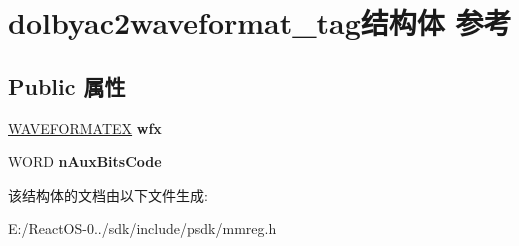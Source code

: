 \hypertarget{structdolbyac2waveformat__tag}{}\section{dolbyac2waveformat\+\_\+tag结构体 参考}
\label{structdolbyac2waveformat__tag}
\subsection*{Public 属性}
\begin{DoxyCompactItemize}
\item 
\mbox{\label{structdolbyac2waveformat__tag_a568819e0cd9f571ed2b7181648610e3f}} 
\hyperlink{struct_w_a_v_e_f_o_r_m_a_t_e_x}{W\+A\+V\+E\+F\+O\+R\+M\+A\+T\+EX} {\bfseries wfx}
\item 
\mbox{\label{structdolbyac2waveformat__tag_a73cc8769d8a77a374cefa543c048572c}} 
W\+O\+RD {\bfseries n\+Aux\+Bits\+Code}
\end{DoxyCompactItemize}


该结构体的文档由以下文件生成\+:\begin{DoxyCompactItemize}
\item 
E\+:/\+React\+O\+S-\/0../sdk/include/psdk/mmreg.\+h\end{DoxyCompactItemize}
